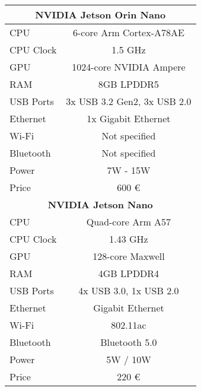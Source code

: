 \begin{longtable}{|l|c|}
	\hline

	\multicolumn{2}{|c|}{\textbf{NVIDIA Jetson Orin Nano}}                    \\
	\hline
	CPU       & 6-core Arm Cortex-A78AE                                       \\
	CPU Clock & 1.5 GHz                                                       \\
	GPU       & 1024-core NVIDIA Ampere                                       \\
	RAM       & 8GB LPDDR5                                                    \\
	USB Ports & 3x USB 3.2 Gen2, 3x USB 2.0                                   \\
	Ethernet  & 1x Gigabit Ethernet                                           \\
	Wi-Fi     & Not specified                                                 \\
	Bluetooth & Not specified                                                 \\
	Power     & 7W - 15W                                                      \\
	Price     & 600 \euro                                                     \\
	\hline

	\multicolumn{2}{|c|}{\textbf{NVIDIA Jetson Nano}}                         \\
	\hline
	CPU       & Quad-core Arm A57                                             \\
	CPU Clock & 1.43 GHz                                                      \\
	GPU       & 128-core Maxwell                                              \\
	RAM       & 4GB LPDDR4                                                    \\
	USB Ports & 4x USB 3.0, 1x USB 2.0                                        \\
	Ethernet  & Gigabit Ethernet                                              \\
	Wi-Fi     & 802.11ac                                                      \\
	Bluetooth & Bluetooth 5.0                                                 \\
	Power     & 5W / 10W                                                      \\
	Price     & 220 \euro                                                     \\
	\hline


\end{longtable}
